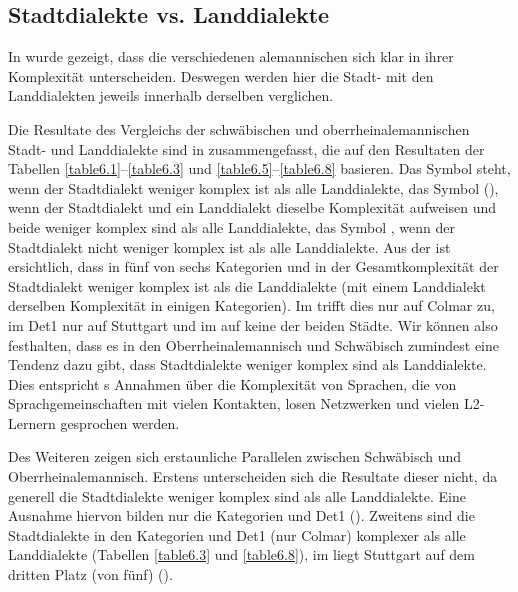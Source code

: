 \subsection{Stadtdialekte vs. Landdialekte}\label{6.3.2}

In  wurde gezeigt, dass die verschiedenen alemannischen  sich klar in ihrer Komplexität unterscheiden. Deswegen werden hier die Stadt- mit den Landdialekten jeweils innerhalb derselben  verglichen.

Die Resultate des Vergleichs der schwäbischen und oberrheinalemannischen Stadt- und Landdialekte sind in  zusammengefasst, die auf den Resultaten der Tabellen \ref{table6.1}–\ref{table6.3} und \ref{table6.5}–\ref{table6.8} basieren. Das Symbol  steht, wenn der Stadtdialekt weniger komplex ist als alle Landdialekte, das Symbol (), wenn der Stadtdialekt und ein Landdialekt dieselbe Komplexität aufweisen und beide weniger komplex sind als alle Landdialekte, das Symbol , wenn der Stadtdialekt nicht weniger komplex ist als alle Landdialekte. Aus der  ist ersichtlich, dass in fünf von sechs Kategorien und in der Gesamtkomplexität der Stadtdialekt weniger komplex ist als die Landdialekte (mit einem Landdialekt derselben Komplexität in einigen Kategorien). Im  trifft dies nur auf Colmar zu, im Det1 nur auf Stuttgart und im  auf keine der beiden Städte. Wir können also festhalten, dass es in den  Oberrheinalemannisch und Schwäbisch zumindest eine Tendenz dazu gibt, dass Stadtdialekte weniger komplex sind als Landdialekte. Dies entspricht \citeauthor{Trudgill2011}s \citeyearpar{Trudgill2011} Annahmen über die Komplexität von Sprachen, die von Sprachgemeinschaften mit vielen Kontakten, losen Netzwerken und vielen L2-Ler\-nern gesprochen werden.

Des Weiteren zeigen sich erstaunliche Parallelen zwischen Schwäbisch und Oberrheinalemannisch. Erstens unterscheiden sich die Resultate dieser  nicht, da generell die Stadtdialekte weniger komplex sind als alle Landdialekte. Eine Ausnahme hiervon bilden nur die Kategorien  und Det1 (). Zweitens sind die Stadtdialekte in den Kategorien  und Det1 (nur Colmar) komplexer als alle Landdialekte (Tabellen \ref{table6.3} und \ref{table6.8}), im  liegt Stuttgart auf dem dritten Platz (von fünf) ().

